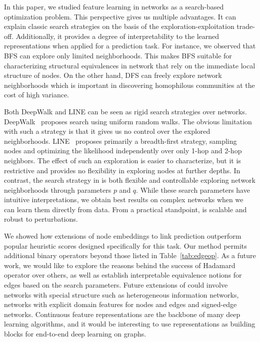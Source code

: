 
In this paper, we studied feature learning in networks as a search-based optimization problem. This perspective gives us multiple advantages. It can explain classic search strategies on the basis of the exploration-exploitation trade-off. Additionally, it provides a degree of interpretability to the learned representations when applied for a prediction task. For instance, we observed that BFS can explore only limited neighborhoods. This makes BFS suitable for characterizing structural equivalences in network that rely on the immediate local structure of nodes. On the other hand, DFS can freely explore network neighborhoods which is important in discovering homophilous communities at the cost of high variance. 

Both DeepWalk and LINE can be seen as rigid search strategies over networks. DeepWalk~\cite{deepwalk} proposes search using uniform random walks. The obvious limitation with such a strategy is that it gives us no control over the explored neighborhoods. LINE~\cite{line} proposes primarily a breadth-first strategy, sampling nodes and optimizing the likelihood independently over only 1-hop and 2-hop neighbors. The effect of such an exploration is easier to characterize, but it is restrictive and provides no flexibility in exploring nodes at further depths. In contrast, the search strategy in \nodevec is both flexible and controllable exploring network neighborhoods through parameters $p$ and $q$. While these search parameters have intuitive interpretations, we obtain best results on complex networks when we can learn them directly from data. From a practical standpoint, \nodevec is scalable and robust to perturbations.

We showed how extensions of node embeddings to link prediction outperform popular heuristic scores designed specifically for this task. Our method permits additional binary operators beyond those listed in Table~\ref{tab:edgeop}. As a future work, we would like to explore the reasons behind the success of Hadamard operator over others, as well as establish interpretable equivalence notions for edges based on the search parameters. Future extensions of \nodevec could involve networks with special structure such as heterogeneous information networks, networks with explicit domain features for nodes and edges and signed-edge networks. Continuous feature representations are the backbone of many deep learning algorithms, and it would be interesting to use \nodevec representations as building blocks for end-to-end deep learning on graphs.




